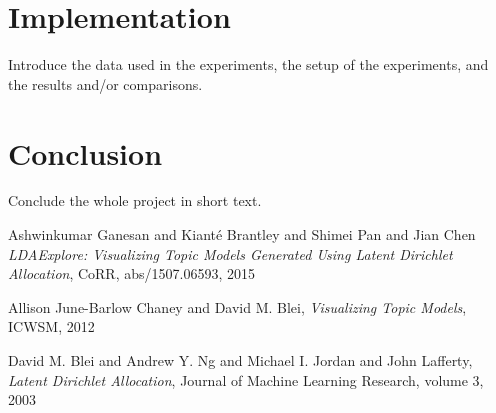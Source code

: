 \documentclass[11pt]{article}
\begin{document}

\section{Implementation}
%
Introduce the data used in the experiments, the setup of the experiments, and the results and/or comparisons. \\

\section{Conclusion}
%
Conclude the whole project in short text.

\begin{thebibliography}{9}
  
  Ashwinkumar Ganesan and Kiant{\'e} Brantley and Shimei Pan and Jian Chen
  \textit{LDAExplore: Visualizing Topic Models Generated Using Latent Dirichlet Allocation},
  CoRR,
  abs/1507.06593,
  2015
  
  Allison June-Barlow Chaney and David M. Blei,
  \textit{Visualizing Topic Models},
  ICWSM,
  2012
  
    David M. Blei and Andrew Y. Ng and Michael I. Jordan and John Lafferty,
    \textit{Latent Dirichlet Allocation},
    Journal of Machine Learning Research, volume 3,
    2003

\end{thebibliography}
 
\end{document}
